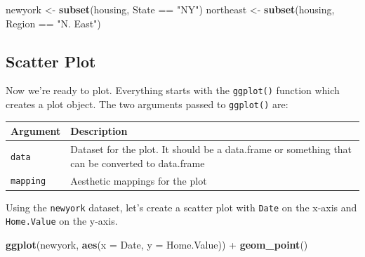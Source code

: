 \documentclass[]{article}
\newenvironment{Shaded}{\begin{snugshade}}{\end{snugshade}}
\newcommand{\KeywordTok}[1]{\textcolor[rgb]{0.13,0.29,0.53}{\textbf{{#1}}}}
\newcommand{\DataTypeTok}[1]{\textcolor[rgb]{0.13,0.29,0.53}{{#1}}}
\newcommand{\StringTok}[1]{\textcolor[rgb]{0.31,0.60,0.02}{{#1}}}
\newcommand{\NormalTok}[1]{{#1}}
\theoremstyle{definition}
\theoremstyle{definition}
\theoremstyle{definition}
\theoremstyle{remark}
\begin{document}
\begin{Shaded}
\begin{Highlighting}[]
\NormalTok{newyork <-}\StringTok{ }\KeywordTok{subset}\NormalTok{(housing, State ==}\StringTok{ "NY"}\NormalTok{)}
\NormalTok{northeast <-}\StringTok{ }\KeywordTok{subset}\NormalTok{(housing, Region ==}\StringTok{ "N. East"}\NormalTok{)}
\end{Highlighting}
\end{Shaded}

\subsection{Scatter Plot}\label{scatter-plot}

Now we're ready to plot. Everything starts with the \texttt{ggplot()}
function which creates a plot object. The two arguments passed to
\texttt{ggplot()} are:

\begin{longtable}[c]{@{}ll@{}}
\toprule
\begin{minipage}[b]{0.13\columnwidth}\raggedright\strut
Argument
\strut\end{minipage} &
\begin{minipage}[b]{0.80\columnwidth}\raggedright\strut
Description
\strut\end{minipage}\tabularnewline
\midrule
\endhead
\begin{minipage}[t]{0.13\columnwidth}\raggedright\strut
\texttt{data}
\strut\end{minipage} &
\begin{minipage}[t]{0.80\columnwidth}\raggedright\strut
Dataset for the plot. It should be a data.frame or something that can be
converted to data.frame
\strut\end{minipage}\tabularnewline
\begin{minipage}[t]{0.13\columnwidth}\raggedright\strut
\texttt{mapping}
\strut\end{minipage} &
\begin{minipage}[t]{0.80\columnwidth}\raggedright\strut
Aesthetic mappings for the plot
\strut\end{minipage}\tabularnewline
\bottomrule
\end{longtable}

Using the \texttt{newyork} dataset, let's create a scatter plot with
\texttt{Date} on the x-axis and \texttt{Home.Value} on the y-axis.

\begin{Shaded}
\begin{Highlighting}[]
\KeywordTok{ggplot}\NormalTok{(newyork, }\KeywordTok{aes}\NormalTok{(}\DataTypeTok{x =} \NormalTok{Date, }\DataTypeTok{y =} \NormalTok{Home.Value)) +}
\StringTok{  }\KeywordTok{geom_point}\NormalTok{()}
\end{Highlighting}
\end{Shaded}
\end{document}
